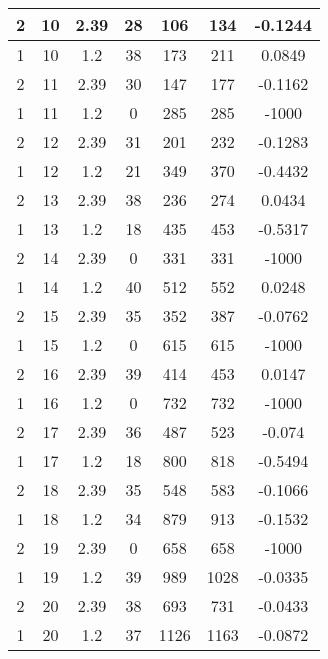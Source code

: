 \documentclass[letterpaper, 12pt]{article}
\begin{document}
\begin{longtable}{|c|c|c|c|c|c|c|}
\hline
2 & 10 & 2.39 & 28 & 106 & 134 & -0.1244 \\
\hline
1 & 10 & 1.2 & 38 & 173 & 211 & 0.0849 \\
\hline
2 & 11 & 2.39 & 30 & 147 & 177 & -0.1162 \\
\hline
1 & 11 & 1.2 & 0 & 285 & 285 & -1000 \\
\hline
2 & 12 & 2.39 & 31 & 201 & 232 & -0.1283 \\
\hline
1 & 12 & 1.2 & 21 & 349 & 370 & -0.4432 \\
\hline
2 & 13 & 2.39 & 38 & 236 & 274 & 0.0434 \\
\hline
1 & 13 & 1.2 & 18 & 435 & 453 & -0.5317 \\
\hline
2 & 14 & 2.39 & 0 & 331 & 331 & -1000 \\
\hline
1 & 14 & 1.2 & 40 & 512 & 552 & 0.0248 \\
\hline
2 & 15 & 2.39 & 35 & 352 & 387 & -0.0762 \\
\hline
1 & 15 & 1.2 & 0 & 615 & 615 & -1000 \\
\hline
2 & 16 & 2.39 & 39 & 414 & 453 & 0.0147 \\
\hline
1 & 16 & 1.2 & 0 & 732 & 732 & -1000 \\
\hline
2 & 17 & 2.39 & 36 & 487 & 523 & -0.074 \\
\hline
1 & 17 & 1.2 & 18 & 800 & 818 & -0.5494 \\
\hline
2 & 18 & 2.39 & 35 & 548 & 583 & -0.1066 \\
\hline
1 & 18 & 1.2 & 34 & 879 & 913 & -0.1532 \\
\hline
2 & 19 & 2.39 & 0 & 658 & 658 & -1000 \\
\hline
1 & 19 & 1.2 & 39 & 989 & 1028 & -0.0335 \\
\hline
2 & 20 & 2.39 & 38 & 693 & 731 & -0.0433 \\
\hline
1 & 20 & 1.2 & 37 & 1126 & 1163 & -0.0872 \\
\hline
\end{longtable}
\end{document}
